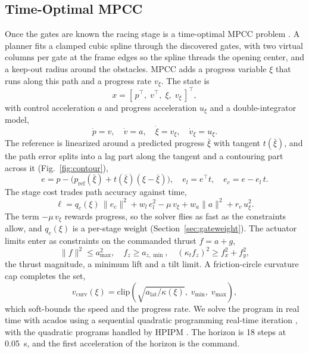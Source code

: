 \documentclass[conference]{IEEEtran}
\begin{document}
\subsection{Time-Optimal MPCC}
\label{sec:mpcc}
Once the gates are known the racing stage is a time-optimal MPCC problem \cite{mpcc,lam}. A planner fits a clamped cubic spline through the discovered gates, with two virtual columns per gate at the frame edges so the spline threads the opening center, and a keep-out radius around the obstacles. MPCC adds a progress variable $\xi$ that runs along this path and a progress rate $v_\xi$. The state is
\begin{equation}
x = [\, p^\top,\; v^\top,\; \xi,\; v_\xi \,]^\top,
\end{equation}
with control acceleration $a$ and progress acceleration $u_\xi$ and a double-integrator model,
\begin{equation}
\dot p = v,\quad \dot v = a,\quad \dot\xi = v_\xi,\quad \dot v_\xi = u_\xi .
\end{equation}
The reference is linearized around a predicted progress $\bar\xi$ with tangent $t(\bar\xi)$, and the path error splits into a lag part along the tangent and a contouring part across it (Fig.~\ref{fig:contour}),
\begin{equation}
e = p - \big(p_{\text{ref}}(\bar\xi) + t(\bar\xi)(\xi-\bar\xi)\big),\quad e_l = e^\top t,\quad e_c = e - e_l\,t .
\end{equation}
The stage cost trades path accuracy against time,
\begin{equation}
\ell = q_c(\xi)\,\lVert e_c \rVert^2 + w_l\, e_l^2 - \mu\, v_\xi + w_a \lVert a \rVert^2 + r_v\, u_\xi^2 .
\label{eq:cost}
\end{equation}
The term $-\mu\, v_\xi$ rewards progress, so the solver flies as fast as the constraints allow, and $q_c(\xi)$ is a per-stage weight (Section~\ref{sec:gateweight}). The actuator limits enter as constraints on the commanded thrust $f = a + g$,
\begin{equation}
\lVert f \rVert^2 \le a_{\max}^2, \quad f_z \ge a_{z,\min}, \quad (\kappa_t f_z)^2 \ge f_x^2 + f_y^2,
\end{equation}
the thrust magnitude, a minimum lift and a tilt limit. A friction-circle curvature cap completes the set,
\begin{equation}
v_{\text{curv}}(\xi) = \mathrm{clip}\!\left(\sqrt{a_{\text{lat}}/\kappa(\xi)},\; v_{\min},\; v_{\max}\right),
\label{eq:curv}
\end{equation}
which soft-bounds the speed and the progress rate. We solve the program in real time with acados \cite{acados} using a sequential quadratic programming real-time iteration \cite{rti}, with the quadratic programs handled by HPIPM \cite{hpipm}. The horizon is 18 steps at 0.05~s, and the first acceleration of the horizon is the command.
\end{document}
